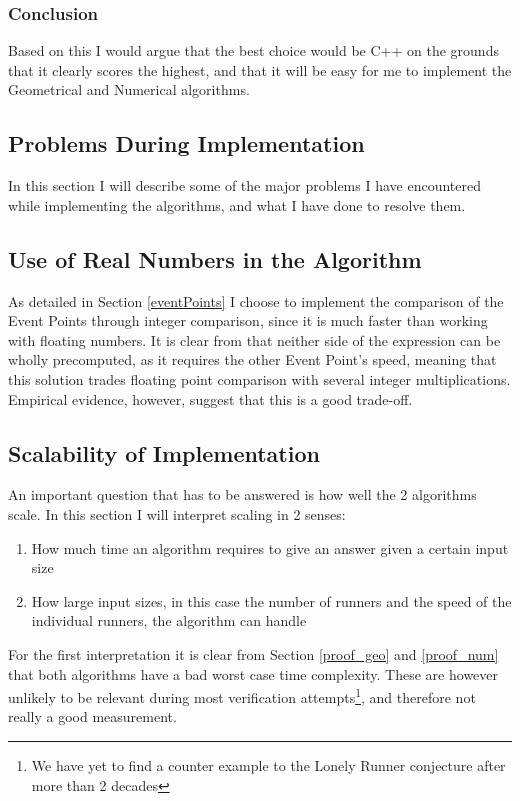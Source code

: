 \subsubsection{Conclusion}
Based on this I would argue that the best choice would be C++ on the grounds that it clearly scores the highest, and that it will be easy for me to implement the Geometrical and Numerical algorithms.

\subsection{Problems During Implementation}
In this section I will describe some of the major problems I have encountered while implementing the algorithms, and what I have done to resolve them.

\subsection{Use of Real Numbers in the Algorithm}
As detailed in Section \ref{eventPoints} I choose to implement the comparison of the Event Points through integer comparison, since it is much faster than working with floating numbers. It is clear from  that neither side of the expression can be wholly precomputed, as it requires the other Event Point's speed, meaning that this solution trades floating point comparison with several integer multiplications. Empirical evidence, however, suggest that this is a good trade-off.

\subsection{Scalability of Implementation}
\label{scale}
An important question that has to be answered is how well the 2 algorithms scale. In this section I will interpret scaling in 2 senses:
\begin{enumerate}
\item How much time an algorithm requires to give an answer given a certain input size
\item How large input sizes, in this case the number of runners and the speed of the individual runners, the algorithm can handle
\end{enumerate}

For the first interpretation it is clear from Section \ref{proof_geo} and \ref{proof_num} that both algorithms have a bad worst case time complexity. These are however unlikely to be relevant during most verification attempts\footnote{We have yet to find a counter example to the Lonely Runner conjecture after more than 2 decades}, and therefore not really a good measurement. 

